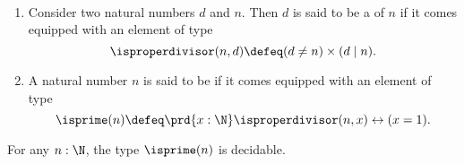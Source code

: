 \begin{defn}
  ~
  \begin{enumerate}
  \item Consider two natural numbers $d$ and $n$. Then $d$ is said to be a  of $n$ if it comes equipped with an element of type
    \begin{equation*}
      \isproperdivisor(n,d)\defeq (d\neq n)\times (d\mid n).
    \end{equation*}
  \item A natural number $n$ is said to be  if it comes equipped with an element of type
  \begin{equation*}
    \isprime(n)\defeq \prd{x:\N}\isproperdivisor(n,x)\leftrightarrow (x=1).
  \end{equation*}
  \end{enumerate}
\end{defn}

\begin{prp}
  For any $n:\N$, the type $\isprime(n)$ is decidable.
\end{prp}

